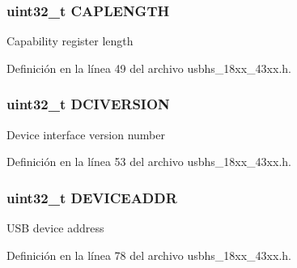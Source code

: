 \subsubsection[{\texorpdfstring{C\+A\+P\+L\+E\+N\+G\+TH}{CAPLENGTH}}]{ uint32\+\_\+t C\+A\+P\+L\+E\+N\+G\+TH}\hypertarget{struct_l_p_c___u_s_b_h_s___t_af21648bd693741c08a0d9a8a7cbfda19}{}\label{struct_l_p_c___u_s_b_h_s___t_af21648bd693741c08a0d9a8a7cbfda19}
Capability register length 

Definición en la línea 49 del archivo usbhs\+\_\+18xx\+\_\+43xx.\+h.

\subsubsection[{\texorpdfstring{D\+C\+I\+V\+E\+R\+S\+I\+ON}{DCIVERSION}}]{ uint32\+\_\+t D\+C\+I\+V\+E\+R\+S\+I\+ON}\hypertarget{struct_l_p_c___u_s_b_h_s___t_ad5c89e60eca897d24aafc92005a7f477}{}\label{struct_l_p_c___u_s_b_h_s___t_ad5c89e60eca897d24aafc92005a7f477}
Device interface version number 

Definición en la línea 53 del archivo usbhs\+\_\+18xx\+\_\+43xx.\+h.

\subsubsection[{\texorpdfstring{D\+E\+V\+I\+C\+E\+A\+D\+DR}{DEVICEADDR}}]{ uint32\+\_\+t D\+E\+V\+I\+C\+E\+A\+D\+DR}\hypertarget{struct_l_p_c___u_s_b_h_s___t_a281cfe97943157d3dcea5f30c203d20a}{}\label{struct_l_p_c___u_s_b_h_s___t_a281cfe97943157d3dcea5f30c203d20a}
U\+SB device address 

Definición en la línea 78 del archivo usbhs\+\_\+18xx\+\_\+43xx.\+h.

